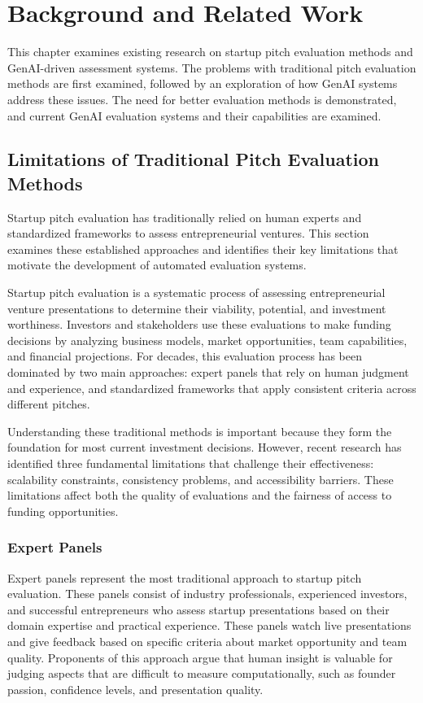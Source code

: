 \chapter{Background and Related Work}
\label{ch:soa}
This chapter examines existing research on startup pitch evaluation methods and GenAI-driven assessment systems. The problems with traditional pitch evaluation methods are first examined, followed by an exploration of how GenAI systems address these issues. The need for better evaluation methods is demonstrated, and current GenAI evaluation systems and their capabilities are examined.

\section{Limitations of Traditional Pitch Evaluation Methods}
\label{sec:traditional-methods}

Startup pitch evaluation has traditionally relied on human experts and standardized frameworks to assess entrepreneurial ventures. This section examines these established approaches and identifies their key limitations that motivate the development of automated evaluation systems.

Startup pitch evaluation is a systematic process of assessing entrepreneurial venture presentations to determine their viability, potential, and investment worthiness. Investors and stakeholders use these evaluations to make funding decisions by analyzing business models, market opportunities, team capabilities, and financial projections. For decades, this evaluation process has been dominated by two main approaches: expert panels that rely on human judgment and experience, and standardized frameworks that apply consistent criteria across different pitches.

Understanding these traditional methods is important because they form the foundation for most current investment decisions. However, recent research has identified three fundamental limitations that challenge their effectiveness: scalability constraints, consistency problems, and accessibility barriers. These limitations affect both the quality of evaluations and the fairness of access to funding opportunities.

\subsection{Expert Panels}\label{subsec:expert-panels}

Expert panels represent the most traditional approach to startup pitch evaluation. These panels consist of industry professionals, experienced investors, and successful entrepreneurs who assess startup presentations based on their domain expertise and practical experience. These panels watch live presentations and give feedback based on specific criteria about market opportunity and team quality. Proponents of this approach argue that human insight is valuable for judging aspects that are difficult to measure computationally, such as founder passion, confidence levels, and presentation quality.

